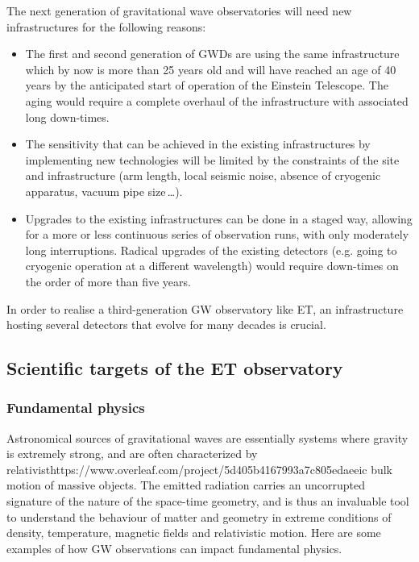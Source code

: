 The next generation of gravitational wave observatories will need new infrastructures for the following reasons:
\begin{itemize}
    \item The first and second generation of GWDs are using the same infrastructure which by now is more than 25 years old and will have reached an age of 40 years by the anticipated start of operation of the Einstein Telescope. The aging would require a complete overhaul of the infrastructure with associated long down-times.
    \item The sensitivity that can be achieved in the existing infrastructures by implementing new technologies will be limited by the constraints of the site and infrastructure (arm length, local seismic noise, absence of cryogenic apparatus, vacuum pipe size\,\ldots).
    \item Upgrades to the existing infrastructures can be done in a staged way, allowing for a more or less continuous series of observation runs, with only moderately long interruptions. Radical upgrades of the existing detectors (e.g. going to cryogenic operation at a different wavelength) would require down-times on the order of more than five years. 
\end{itemize} 
In order to realise a third-generation GW observatory like ET, an infrastructure hosting several detectors that evolve for many decades is crucial.

\clearpage

\subsection{Scientific targets of the ET observatory}
\subsubsection{Fundamental physics}
\label{ScienceCase:FundamentalPhysics}
Astronomical sources of gravitational waves are essentially systems where gravity is extremely strong, and are often characterized by relativisthttps://www.overleaf.com/project/5d405b4167993a7c805edaeeic bulk motion of massive objects. The emitted radiation carries an uncorrupted signature of the nature of the space-time geometry, and is thus an invaluable tool to understand the behaviour of matter and geometry in extreme conditions of density, temperature, magnetic fields and relativistic motion. Here are some examples of how GW observations can impact fundamental physics.

